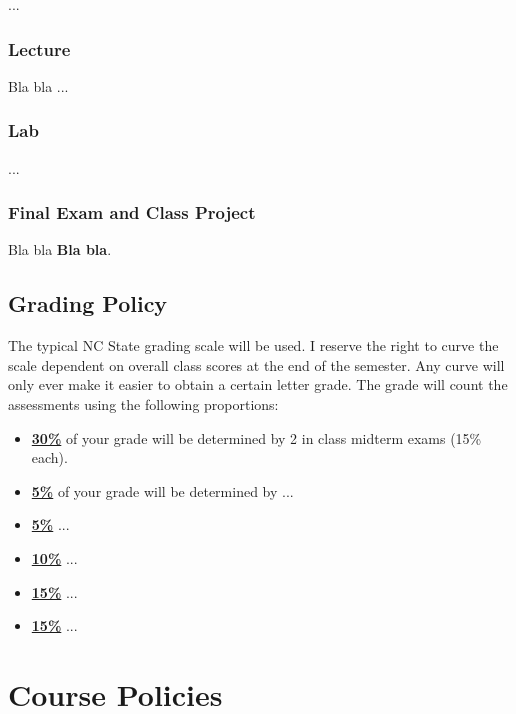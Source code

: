 \documentclass[11pt]{article}
\begin{document}
...

\subsubsection*{Lecture}
Bla bla ...

\subsubsection*{Lab}
...

\subsubsection*{Final Exam and Class Project}

Bla bla \textbf{Bla bla}.

\subsection*{Grading Policy}
The typical NC State grading scale will be used. I reserve the right to curve the scale dependent on overall class scores at the end of the semester. Any curve will only ever make it easier to obtain a certain letter grade. The grade will count the assessments using the following proportions:
\begin{itemize}
	\item \underline{\textbf{30\%}} of your grade will be determined by 2 in class midterm exams (15\% each).
	\item \underline{\textbf{5\%}} of your grade will be determined by ...
	\item \underline{\textbf{5\%}} ...
    \item \underline{\textbf{10\%}}  ...
	\item \underline{\textbf{15\%}} ...
	\item \underline{\textbf{15\%}} ...
\end{itemize}


\begin{figure*}
\end{figure*}


\newpage
\section*{Course Policies}
\end{document}
